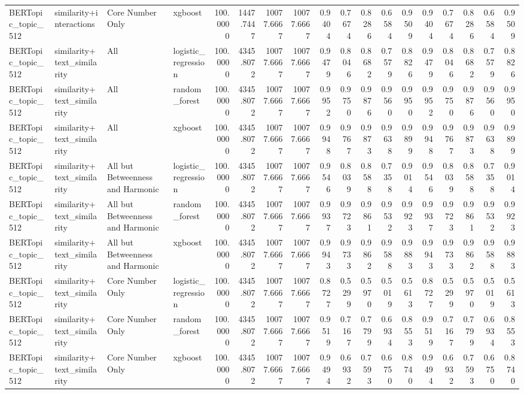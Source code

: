 \begin{tabular}{llllrrrrrrrrrrrrrr}
BERTopic_topic_512 & similarity+interactions & Core Number Only & xgboost & 100.0000 & 1447.7447 & 10077.6667 & 10077.6667 & 0.9404 & 0.7674 & 0.8286 & 0.6584 & 0.9509 & 0.9404 & 0.7674 & 0.8286 & 0.6584 & 0.9509 \\
BERTopic_topic_512 & similarity+text_similarity & All & logistic_regression & 100.0000 & 4345.8072 & 10077.6667 & 10077.6667 & 0.9479 & 0.8046 & 0.8682 & 0.7579 & 0.8826 & 0.9479 & 0.8046 & 0.8682 & 0.7579 & 0.8826 \\
BERTopic_topic_512 & similarity+text_similarity & All & random_forest & 100.0000 & 4345.8072 & 10077.6667 & 10077.6667 & 0.9952 & 0.9750 & 0.9876 & 0.9560 & 0.9950 & 0.9952 & 0.9750 & 0.9876 & 0.9560 & 0.9950 \\
BERTopic_topic_512 & similarity+text_similarity & All & xgboost & 100.0000 & 4345.8072 & 10077.6667 & 10077.6667 & 0.9948 & 0.9767 & 0.9873 & 0.9638 & 0.9899 & 0.9948 & 0.9767 & 0.9873 & 0.9638 & 0.9899 \\
BERTopic_topic_512 & similarity+text_similarity & All but Betweenness and Harmonic & logistic_regression & 100.0000 & 4345.8072 & 10077.6667 & 10077.6667 & 0.9546 & 0.8039 & 0.8588 & 0.7358 & 0.9014 & 0.9546 & 0.8039 & 0.8588 & 0.7358 & 0.9014 \\
BERTopic_topic_512 & similarity+text_similarity & All but Betweenness and Harmonic & random_forest & 100.0000 & 4345.8072 & 10077.6667 & 10077.6667 & 0.9937 & 0.9723 & 0.9861 & 0.9532 & 0.9923 & 0.9937 & 0.9723 & 0.9861 & 0.9532 & 0.9923 \\
BERTopic_topic_512 & similarity+text_similarity & All but Betweenness and Harmonic & xgboost & 100.0000 & 4345.8072 & 10077.6667 & 10077.6667 & 0.9943 & 0.9733 & 0.9862 & 0.9588 & 0.9883 & 0.9943 & 0.9733 & 0.9862 & 0.9588 & 0.9883 \\
BERTopic_topic_512 & similarity+text_similarity & Core Number Only & logistic_regression & 100.0000 & 4345.8072 & 10077.6667 & 10077.6667 & 0.8727 & 0.5299 & 0.5970 & 0.5019 & 0.5613 & 0.8727 & 0.5299 & 0.5970 & 0.5019 & 0.5613 \\
BERTopic_topic_512 & similarity+text_similarity & Core Number Only & random_forest & 100.0000 & 4345.8072 & 10077.6667 & 10077.6667 & 0.9519 & 0.7167 & 0.7799 & 0.6934 & 0.8553 & 0.9519 & 0.7167 & 0.7799 & 0.6934 & 0.8553 \\
BERTopic_topic_512 & similarity+text_similarity & Core Number Only & xgboost & 100.0000 & 4345.8072 & 10077.6667 & 10077.6667 & 0.9494 & 0.6932 & 0.7593 & 0.6750 & 0.8740 & 0.9494 & 0.6932 & 0.7593 & 0.6750 & 0.8740 \\

\end{tabular}
